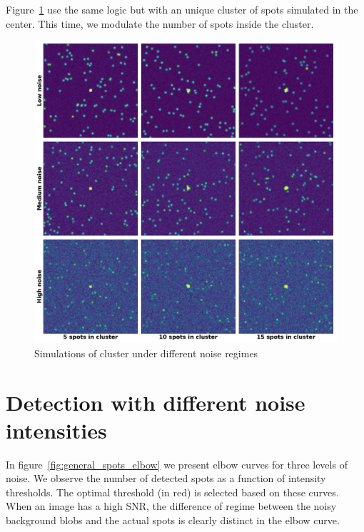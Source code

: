 \null
\vfill

Figure~\ref{fig:cluster_mosaic} use the same logic but with an unique cluster of spots simulated in the center.
This time, we modulate the number of spots inside the cluster.

\vfill

\begin{figure}[h]
    \centering
    \includegraphics[width=\textwidth]{figures/appendix/cluster_mosaic}
    \caption{Simulations of cluster under different noise regimes}
    \label{fig:cluster_mosaic}
\end{figure}

\newpage

\section{Detection with different noise intensities} \label{sec:appendix_detection}

\vfill

In figure~\ref{fig:general_spots_elbow} we present elbow curves for three levels of noise.
We observe the number of detected spots as a function of intensity thresholds.
The optimal threshold (in red) is selected based on these curves.
When an image has a high \ac{SNR}, the difference of regime between the noisy background blobs and the actual spots is clearly distinct in the elbow curve.

